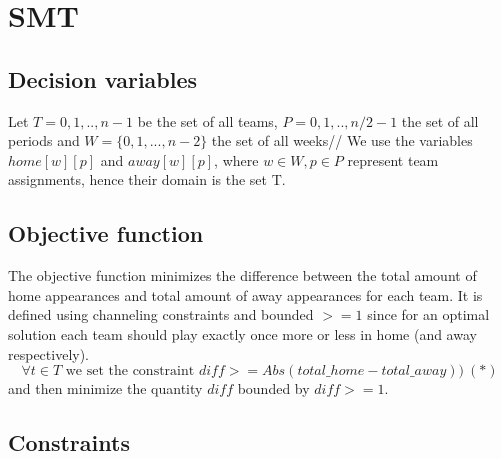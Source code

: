 \documentclass{article}
\begin{document}





\section{SMT}

\subsection{Decision variables}
Let $T ={0,1,..,n-1}$ be the set of all teams, $P={0,1,..,n/2-1}$ the set of all periods and $W=\{0,1,...,n-2\}$ the set of all weeks//
 We use the variables $home[w][p]$ and $away[w][p]$, where $w \in W, p \in P$ represent team assignments, hence their domain is the set T. 

\subsection{Objective function}
The objective function minimizes the difference between the total amount of home appearances and total amount of away appearances for each team. It is defined using channeling constraints and bounded $>=1$ since for an optimal solution each team should play exactly once more or less in home (and away respectively). 
$$ \forall t \in T \text{ we set the constraint }diff >= Abs(total\_home - total\_away))\  \mathbf{(*)}$$ 
and then minimize the quantity $diff$ bounded by $diff>=1$.

\subsection{Constraints}
\end{document}
